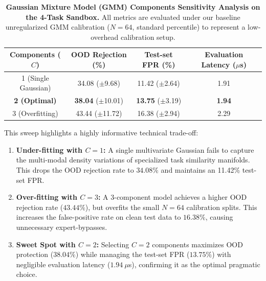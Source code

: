 \documentclass{article}
\theoremstyle{plain}
\theoremstyle{definition}
\theoremstyle{remark}
\begin{document}
\begin{table}[h]
\caption{\textbf{Gaussian Mixture Model (GMM) Components Sensitivity Analysis on the 4-Task Sandbox.} All metrics are evaluated under our baseline unregularized GMM calibration ($N=64$, standard percentile) to represent a low-overhead calibration setup.}
\label{tab:app_components_sweep}
\vskip 0.1in
\begin{center}
\begin{small}
\begin{sc}
\begin{tabular}{cccc}
\toprule
Components ($C$) & OOD Rejection (\%) & Test-set FPR (\%) & Evaluation Latency ($\mu$s) \\
\midrule
1 (Single Gaussian) & 34.08 ($\pm$9.68)  & 11.42 ($\pm$2.64) & 1.91 \\
\textbf{2 (Optimal)} & \textbf{38.04} ($\pm$10.01) & \textbf{13.75} ($\pm$3.19) & \textbf{1.94} \\
3 (Overfitting) & 43.44 ($\pm$11.72) & 16.38 ($\pm$2.94) & 2.29 \\
\bottomrule
\end{tabular}
\end{sc}
\end{small}
\end{center}
\vskip -0.1in
\end{table}

This sweep highlights a highly informative technical trade-off:
\begin{enumerate}
    \item \textbf{Under-fitting with $C=1$:} A single multivariate Gaussian fails to capture the multi-modal density variations of specialized task similarity manifolds. This drops the OOD rejection rate to $34.08\%$ and maintains an 11.42\% test-set FPR.
    \item \textbf{Over-fitting with $C=3$:} A 3-component model achieves a higher OOD rejection rate ($43.44\%$), but overfits the small $N=64$ calibration splits. This increases the false-positive rate on clean test data to $16.38\%$, causing unnecessary expert-bypasses.
    \item \textbf{Sweet Spot with $C=2$:} Selecting $C=2$ components maximizes OOD protection ($38.04\%$) while managing the test-set FPR ($13.75\%$) with negligible evaluation latency ($1.94\ \mu$s), confirming it as the optimal pragmatic choice.
\end{enumerate}
\end{document}
